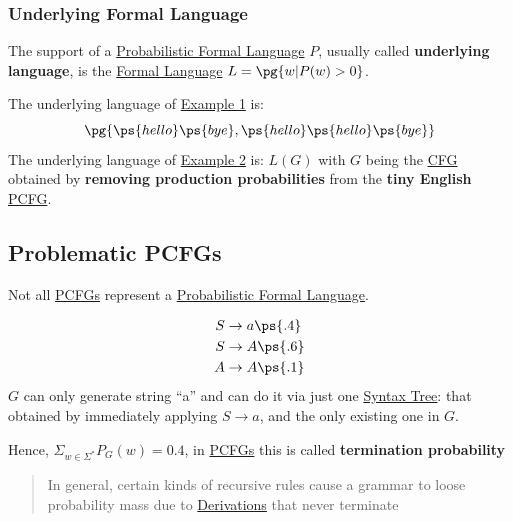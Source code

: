 \subsubsection{Underlying Formal Language}\label{sub:lm_underlying_formal_language} %
The support of a \hyperref[def:pfl]{Probabilistic Formal Language} $P$, usually called \textbf{underlying language}, is the \hyperref[def:linguaggio]{Formal Language} $L = \pg{w | P(w) > 0}$.
\begin{remark}{}{}
    The underlying language of \hyperref[ex:pfl-1]{Example 1} is:
    \[
        \pg{\ps{hello}\ps{bye}, \ps{hello}\ps{hello}\ps{bye}}
    \]
    The underlying language of \hyperref[ex:pfl-2]{Example 2} is: $L(G)$ with $G$ being the \hyperref[def:cfg]{CFG} obtained by \textbf{removing production probabilities} from the \textbf{tiny English} \hyperref[def:pcfg]{PCFG}.
\end{remark}
%
\subsection{Problematic PCFGs}\label{sub:lm_problematic_pcfgs} %
Not all \hyperref[def:pcfg]{PCFGs} represent a \hyperref[def:pfl]{Probabilistic Formal Language}.
\begin{example}{}{}
    \[
        \begin{aligned}
            S&\to a \ps{.4} \\
            S&\to A \ps{.6} \\
            A&\to A \ps{.1}
        \end{aligned}
    \]
    $G$ can only generate string ``a'' and can do it via just one \hyperref[def:pg-syntax-tree]{Syntax Tree}: that obtained by immediately applying $S\to a$, and the only existing one in $G$.
    \begin{note}
        Hence, $\Sigma_{w\in\Sigma^*}P_G(w) = 0.4$, in \hyperref[def:pcfg]{PCFGs} this is called \textbf{termination probability}
    \end{note}
    \begin{quote}
        In general, certain kinds of recursive rules cause a grammar to loose probability mass due to \hyperref[def:pg-derivation]{Derivations} that never terminate
    \end{quote}
\end{example}
%
